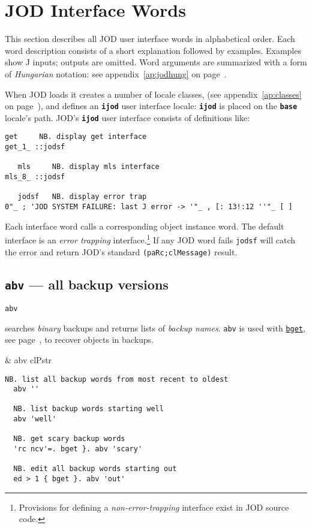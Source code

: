\section{JOD Interface Words}\label{ss:jodwords}

This section describes all JOD user interface words in alphabetical
order.  Each  word description consists of a short explanation followed
by examples.  Examples show J inputs; outputs
are omitted.  Word arguments are summarized with a form of \emph{Hungarian}
notation: see appendix~\ref{ap:jodhung} on
page~\pageref{ap:jodhung}.

When JOD loads it creates a number of locale classes,  (see appendix~\ref{ap:classes}
on page~\pageref{ap:classes}), and defines an \texttt{\textbf{ijod}} user 
interface locale: \texttt{\textbf{ijod}} 
is placed on the \texttt{\textbf{base}} locale's path.
JOD's \texttt{\textbf{ijod}} user interface consists of definitions like:  
\begin{lstlisting}[frame=single,framerule=0pt]
   get     NB. display get interface
get_1_ ::jodsf
    
   mls     NB. display mls interface
mls_8_ ::jodsf

   jodsf   NB. display error trap
0"_ ; 'JOD SYSTEM FAILURE: last J error -> '"_ , [: 13!:12 ''"_ [ ]   
\end{lstlisting}
Each interface word calls a corresponding object instance word.  The
default interface is an \emph{error trapping} interface.\footnote{Provisions
for defining a \emph{non-error-trapping} interface exist in JOD source code.}  If any JOD
word fails \texttt{jodsf} will catch the error and return JOD's standard \verb|(paRc;clMessage)|
result.


\subsection{\texttt{abv} --- all backup versions}\label{ss:abv} 

  \hypertarget{il:abv}{\texttt{abv}} searches \emph{binary} backups and returns lists
  of \emph{backup names}. \texttt{abv} is used with \hyperlink{il:bget}{\texttt{bget}}, see page~\pageref{ss:bget},
  to recover objects in backups.
  
    \begin{wordhead}
\monad & abv clPstr 
\end{wordhead}
\begin{lstlisting}[frame=single,framerule=0pt]
  NB. list all backup words from most recent to oldest
  abv ''

  NB. list backup words starting well
  abv 'well'
  
  NB. get scary backup words 
  'rc ncv'=. bget }. abv 'scary'
  
  NB. edit all backup words starting out
  ed > 1 { bget }. abv 'out' 
\end{lstlisting}

